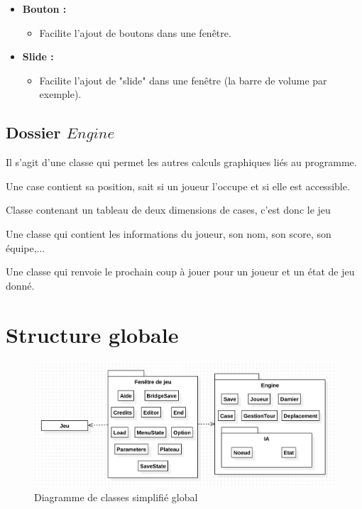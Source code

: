 \documentclass[11pt,a4paper]{article}
\begin{document}
\begin{itemize}
    \item \textbf{Bouton :}
    \begin{itemize} [label=$\Rightarrow$]
    \item Facilite l'ajout de boutons dans une fenêtre.
    \end{itemize}
    
    \item \textbf{Slide :}
    \begin{itemize} [label=$\Rightarrow$]
    \item Facilite l'ajout de "slide" dans une fenêtre (la barre de volume par exemple).
    \end{itemize}
    
\end{itemize}

\subsection{Dossier $Engine$}

Il s'agit d'une classe qui permet les autres calculs graphiques liés au programme.

\begin{description}[itemsep=5pt]
    \item[Case:] Une case contient sa position, sait si un joueur l'occupe et si elle est accessible.
    \item[Damier:] Classe contenant un tableau de deux dimensions de cases, c'est donc le jeu
    \item[Joueur:] Une classe qui contient les informations du joueur, son nom, son score, son équipe,...
    \item[IA:] Une classe qui renvoie le prochain coup à jouer pour un joueur et un état de jeu donné.
\end{description}

\newpage

\section{Structure globale}
    
\begin{figure}[h]
\begin{center}
\includegraphics[width=1\textwidth]{figures/diagramme_simp.png}
\caption{Diagramme de classes simplifié global}
\label{fig:global}
\end{center}
\end{figure}
\end{document}
